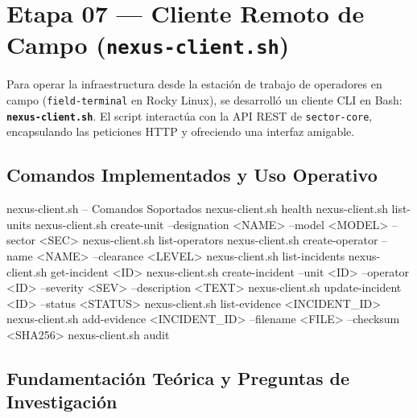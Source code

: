 \documentclass[10pt,a4paper]{article}
\begin{document}
\section{Etapa 07 — Cliente Remoto de Campo (\texttt{nexus-client.sh})}

Para operar la infraestructura desde la estación de trabajo de operadores en campo (\texttt{field-terminal} en Rocky Linux), se desarrolló un cliente CLI en Bash: \textbf{\texttt{nexus-client.sh}}. El script interactúa con la API REST de \texttt{sector-core}, encapsulando las peticiones HTTP y ofreciendo una interfaz amigable.

\subsection{Comandos Implementados y Uso Operativo}

\begin{terminalbox}{nexus-client.sh -- Comandos Soportados}
nexus-client.sh health
nexus-client.sh list-units
nexus-client.sh create-unit --designation <NAME> --model <MODEL> --sector <SEC>
nexus-client.sh list-operators
nexus-client.sh create-operator --name <NAME> --clearance <LEVEL>
nexus-client.sh list-incidents
nexus-client.sh get-incident <ID>
nexus-client.sh create-incident --unit <ID> --operator <ID> --severity <SEV> --description <TEXT>
nexus-client.sh update-incident <ID> --status <STATUS>
nexus-client.sh list-evidence <INCIDENT_ID>
nexus-client.sh add-evidence <INCIDENT_ID> --filename <FILE> --checksum <SHA256>
nexus-client.sh audit
\end{terminalbox}

\subsection{Fundamentación Teórica y Preguntas de Investigación}
\end{document}
